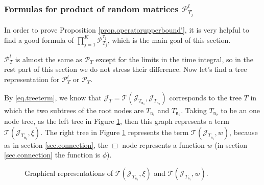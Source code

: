 \subsubsection{Formulas for product of random matrices $\mathcal{P}^l_{T_j}$} In order to prove Proposition \ref{prop.operatorupperbound'}, it is very helpful to find a good formula of  $\prod_{j=1}^K\mathcal{P}^{\tau_j}_{T_j}$, which is the main goal of this section.

$\mathcal{P}^{l}_{T}$ is almost the same as $\mathcal{P}_{T}$ except for the limits in the time integral, so in the rest part of this section we do not stress their difference. Now let's find a tree representation for $\mathcal{P}^{l}_{T}$ or $\mathcal{P}_{T}$.


By \eqref{eq.treeterm}, we know that $\mathcal{J}_{T}=\mathcal{T}(\mathcal{J}_{T_{\mathfrak{n}_1}}, \mathcal{J}_{T_{\mathfrak{n}_2}})$ corresponds to the tree $T$ in which the two subtrees of the root nodes are $T_{\mathfrak{n}_1}$ and $T_{\mathfrak{n}_2}$. Taking $T_{\mathfrak{n}_2}$ to be an one node tree, as the left tree in Figure \ref{fig.T(J,xi)andT(J,w)}, then this graph represents a term $\mathcal{T}(\mathcal{J}_{T_{\mathfrak{n}_1}}, \xi)$. The right tree in Figure \ref{fig.T(J,xi)andT(J,w)} represents the term $\mathcal{T}(\mathcal{J}_{T_{\mathfrak{n}_1}}, w)$, because as in section \ref{sec.connection}, the $\Box$ node represents a function $w$ (in section \ref{sec.connection} the function is $\phi$).

 \begin{figure}[H]
    \centering
        \caption{Graphical representations of $\mathcal{T}(\mathcal{J}_{T_{\mathfrak{n}_1}}, \xi)$ and $\mathcal{T}(\mathcal{J}_{T_{\mathfrak{n}_1}}, w)$.}
        \label{fig.T(J,xi)andT(J,w)}
    \end{figure}

